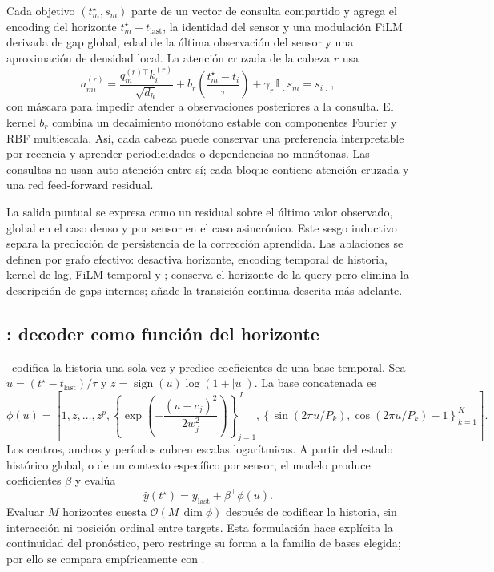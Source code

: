 Cada objetivo $(t_m^\star,s_m)$ parte de un vector de consulta compartido y agrega el encoding del horizonte $t_m^\star-t_{\mathrm{last}}$, la identidad del sensor y una modulación FiLM derivada de gap global, edad de la última observación del sensor y una aproximación de densidad local. La atención cruzada de la cabeza $r$ usa
\begin{equation}
    a_{m i}^{(r)}=
    \frac{q_m^{(r)\top}k_i^{(r)}}{\sqrt{d_h}}
    +b_r\!\left(\frac{t_m^\star-t_i}{\tau}\right)
    +\gamma_r\,\mathbb{I}[s_m=s_i],
\end{equation}
con máscara para impedir atender a observaciones posteriores a la consulta. El kernel $b_r$ combina un decaimiento monótono estable con componentes Fourier y RBF multiescala. Así, cada cabeza puede conservar una preferencia interpretable por recencia y aprender periodicidades o dependencias no monótonas. Las consultas no usan auto-atención entre sí; cada bloque contiene atención cruzada y una red feed-forward residual.

La salida puntual se expresa como un residual sobre el último valor observado, global en el caso denso y por sensor en el caso asincrónico. Este sesgo inductivo separa la predicción de persistencia de la corrección aprendida. Las ablaciones se definen por grafo efectivo:  desactiva horizonte, encoding temporal de historia, kernel de lag, FiLM temporal y \CTSSM;  conserva el horizonte de la query pero elimina la descripción de gaps internos;  añade la transición continua descrita más adelante.

\subsection{\ContinuousBasis: decoder como función del horizonte}
\label{sec:continuous-basis}

\ContinuousBasis\ codifica la historia una sola vez y predice coeficientes de una base temporal. Sea $u=(t^\star-t_{\mathrm{last}})/\tau$ y $z=\operatorname{sign}(u)\log(1+|u|)$. La base concatenada es
\begin{equation}
    \phi(u)=\left[1,z,\ldots,z^p,
    \left\{\exp\!\left(-\frac{(u-c_j)^2}{2w_j^2}\right)\right\}_{j=1}^{J},
    \left\{\sin(2\pi u/P_k),\cos(2\pi u/P_k)-1\right\}_{k=1}^{K}\right].
\end{equation}
Los centros, anchos y períodos cubren escalas logarítmicas. A partir del estado histórico global, o de un contexto específico por sensor, el modelo produce coeficientes $\beta$ y evalúa
\begin{equation}
    \widehat y(t^\star)=y_{\mathrm{last}}+\beta^\top\phi(u).
\end{equation}
Evaluar $M$ horizontes cuesta $\mathcal{O}(M\,\dim\phi)$ después de codificar la historia, sin interacción ni posición ordinal entre targets. Esta formulación hace explícita la continuidad del pronóstico, pero restringe su forma a la familia de bases elegida; por ello se compara empíricamente con \QueryCross.

